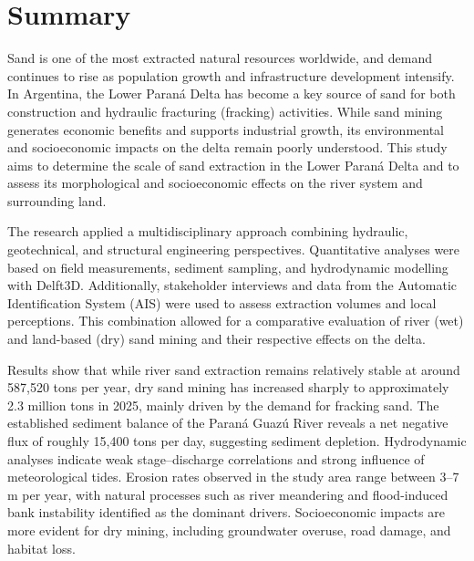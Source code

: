 \chapter*{Summary}
Sand is one of the most extracted natural resources worldwide, and demand continues to rise as population growth and infrastructure development intensify. In Argentina, the Lower Paraná Delta has become a key source of sand for both construction and hydraulic fracturing (fracking) activities. While sand mining generates economic benefits and supports industrial growth, its environmental and socioeconomic impacts on the delta remain poorly understood. This study aims to determine the scale of sand extraction in the Lower Paraná Delta and to assess its morphological and socioeconomic effects on the river system and surrounding land.

The research applied a multidisciplinary approach combining hydraulic, geotechnical, and structural engineering perspectives. Quantitative analyses were based on field measurements, sediment sampling, and hydrodynamic modelling with Delft3D. Additionally, stakeholder interviews and data from the Automatic Identification System (AIS) were used to assess extraction volumes and local perceptions. This combination allowed for a comparative evaluation of river (wet) and land-based (dry) sand mining and their respective effects on the delta.

Results show that while river sand extraction remains relatively stable at around 587,520 tons per year, dry sand mining has increased sharply to approximately 2.3 million tons in 2025, mainly driven by the demand for fracking sand. The established sediment balance of the Paraná Guazú River reveals a net negative flux of roughly 15,400 tons per day, suggesting sediment depletion. Hydrodynamic analyses indicate weak stage–discharge correlations and strong influence of meteorological tides. Erosion rates observed in the study area range between 3–7 m per year, with natural processes such as river meandering and flood-induced bank instability identified as the dominant drivers. Socioeconomic impacts are more evident for dry mining, including groundwater overuse, road damage, and habitat loss.